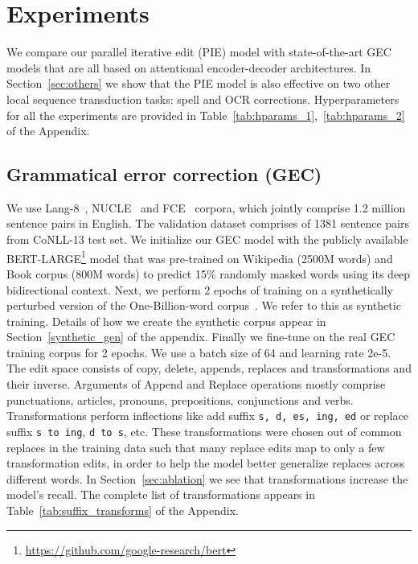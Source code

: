\documentclass[11pt,a4paper]{article}
\begin{document}
\section{Experiments}
\label{Experiments}
We compare our parallel iterative edit (PIE) model with state-of-the-art GEC models that are all based on attentional encoder-decoder architectures. In Section~\ref{sec:others} we show that the PIE model is also effective on two other local sequence transduction tasks: spell and OCR corrections. Hyperparameters for all the experiments are provided in Table~\ref{tab:hparams_1},~\ref{tab:hparams_2} of the Appendix.
\subsection{Grammatical error correction (GEC)}\label{sec:gecexpts}
We use Lang-8~\cite{mizumoto2011mining}, NUCLE~\cite{ng2014conll} and FCE~\cite{yannakoudakis2011new} corpora, which jointly comprise 1.2 million sentence pairs in English.  The validation dataset comprises of 1381 sentence pairs from CoNLL-13 \cite{ngconll} test set.
We initialize our GEC model with the publicly available BERT-LARGE\footnote{\url{https://github.com/google-research/bert}} model that was pre-trained on Wikipedia (2500M words) and Book corpus \cite{zhu2015aligning} (800M words) to predict 15\% randomly masked words using its deep bidirectional context.  Next, we perform 2 epochs of training on a synthetically perturbed version of the One-Billion-word corpus~\cite{chelba2013one}. We refer to this as synthetic training. Details of how we create the synthetic corpus appear in Section~\ref{synthetic_gen} of the appendix.
Finally we fine-tune on the real GEC training corpus for 2 epochs. We use a batch size of 64 and learning rate 2e-5.\\
The edit space consists of copy, delete,  appends,  replaces and  transformations and their inverse. Arguments of Append and Replace operations mostly comprise punctuations, articles, pronouns, prepositions, conjunctions and verbs. Transformations perform inflections like add suffix {\tt s, d, es, ing, ed} or replace suffix {\tt s to ing}, {\tt d to s}, etc. These transformations were chosen out of common replaces in the training data such that many replace edits map to only a few transformation edits, in order to help the model better generalize replaces across different words. In Section~\ref{sec:ablation} we see that transformations increase the model's recall. The complete list of transformations appears in Table~\ref{tab:suffix_transforms} of the Appendix. 
\end{document}
